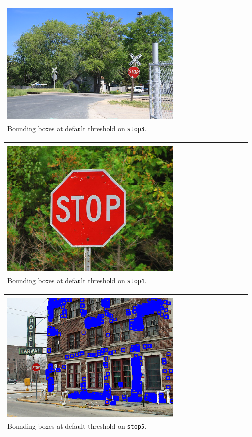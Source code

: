 \documentclass{article}
\begin{document}
\begin{enumerate}[label=(\roman*)]
\begin{tabular}[t]{l}
	\hline \\
	\includegraphics[width=0.7\textwidth]{img/stop3_detection.png} \\
	Bounding boxes at default threshold on \texttt{stop3}. \\
	\hline
\end{tabular}

\begin{tabular}[t]{l}
	\hline \\
	\includegraphics[width=0.7\textwidth]{img/stop4_detection.png} \\
	Bounding boxes at default threshold on \texttt{stop4}. \\
	\hline
\end{tabular}

\begin{tabular}[t]{l}
	\hline \\
	\includegraphics[width=0.7\textwidth]{img/stop5_detection.png} \\
	Bounding boxes at default threshold on \texttt{stop5}. \\
	\hline
\end{tabular}

\end{enumerate}
\end{document}
